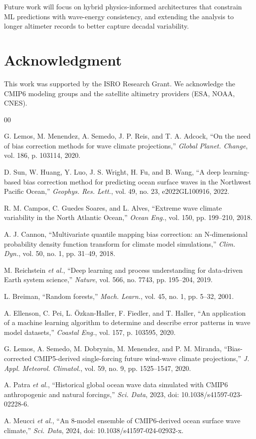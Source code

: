 \documentclass[conference]{IEEEtran}
\begin{document}
Future work will focus on hybrid physics-informed architectures that constrain ML predictions with wave-energy consistency, and extending the analysis to longer altimeter records to better capture decadal variability.

\section*{Acknowledgment}
This work was supported by the ISRO Research Grant. We acknowledge the CMIP6 modeling groups and the satellite altimetry providers (ESA, NOAA, CNES).

\balance
\begin{thebibliography}{00}

G. Lemos, M. Menendez, A. Semedo, J. P. Reis, and T. A. Adcock, ``On the need of bias correction methods for wave climate projections,'' \textit{Global Planet. Change}, vol. 186, p. 103114, 2020.

D. Sun, W. Huang, Y. Luo, J. S. Wright, H. Fu, and B. Wang, ``A deep learning-based bias correction method for predicting ocean surface waves in the Northwest Pacific Ocean,'' \textit{Geophys. Res. Lett.}, vol. 49, no. 23, e2022GL100916, 2022.

R. M. Campos, C. Guedes Soares, and L. Alves, ``Extreme wave climate variability in the North Atlantic Ocean,'' \textit{Ocean Eng.}, vol. 150, pp. 199--210, 2018.

A. J. Cannon, ``Multivariate quantile mapping bias correction: an N-dimensional probability density function transform for climate model simulations,'' \textit{Clim. Dyn.}, vol. 50, no. 1, pp. 31--49, 2018.

M. Reichstein \textit{et al.}, ``Deep learning and process understanding for data-driven Earth system science,'' \textit{Nature}, vol. 566, no. 7743, pp. 195--204, 2019.

L. Breiman, ``Random forests,'' \textit{Mach. Learn.}, vol. 45, no. 1, pp. 5--32, 2001.

A. Ellenson, C. Pei, L. \"Ozkan-Haller, F. Fiedler, and T. Haller, ``An application of a machine learning algorithm to determine and describe error patterns in wave model datasets,'' \textit{Coastal Eng.}, vol. 157, p. 103595, 2020.

G. Lemos, A. Semedo, M. Dobrynin, M. Menendez, and P. M. Miranda, ``Bias-corrected CMIP5-derived single-forcing future wind-wave climate projections,'' \textit{J. Appl. Meteorol. Climatol.}, vol. 59, no. 9, pp. 1525--1547, 2020.

A. Patra \textit{et al.}, ``Historical global ocean wave data simulated with CMIP6 anthropogenic and natural forcings,'' \textit{Sci. Data}, 2023, doi: 10.1038/s41597-023-02228-6.

A. Meucci \textit{et al.}, ``An 8-model ensemble of CMIP6-derived ocean surface wave climate,'' \textit{Sci. Data}, 2024, doi: 10.1038/s41597-024-02932-x.

\end{thebibliography}
\end{document}
